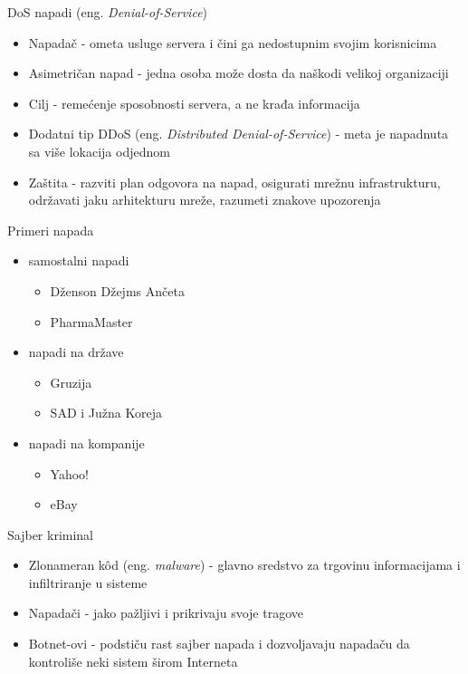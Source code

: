\begin{frame}{DoS napadi (eng. \textit{Denial-of-Service})}

	\begin{itemize}

		\item Napadač - ometa usluge servera i čini ga nedostupnim svojim korisnicima
		\item Asimetričan napad - jedna osoba može dosta da naškodi velikoj organizaciji
		\item Cilj - remećenje sposobnosti servera, a ne krađa informacija
		\item Dodatni tip DDoS (eng. \textit{Distributed Denial-of-Service}) - meta je napadnuta sa više lokacija odjednom
		\item Zaštita - razviti plan odgovora na napad, osigurati mrežnu infrastrukturu, održavati jaku arhitekturu mreže, razumeti znakove upozorenja

	\end{itemize}

\end{frame}


\begin{frame}{Primeri napada}
    \begin{itemize}

    \item samostalni napadi
    	\begin{itemize}
    		\item Dženson Džejms Ančeta
    		\item PharmaMaster
    	\end{itemize}
    
    \item napadi na države
    	\begin{itemize}
    		\item Gruzija
    		\item SAD i Južna Koreja
    	\end{itemize}
    	
    \item napadi na kompanije
    	\begin{itemize}
    		\item Yahoo!
    		\item eBay
    	\end{itemize}
    
    \end{itemize}
    \end{frame}
    

\begin{frame}{Sajber kriminal}

	\begin{itemize}
		
		\item Zlonameran k\^{o}d (eng. \textit{malware}) - glavno sredstvo za trgovinu informacijama i infiltriranje u sisteme
		\item Napadači - jako pažljivi i prikrivaju svoje tragove
		\item Botnet-ovi - podstiču rast sajber napada i dozvoljavaju napadaču da kontroliše neki sistem širom Interneta
		
	\end{itemize}

\end{frame}